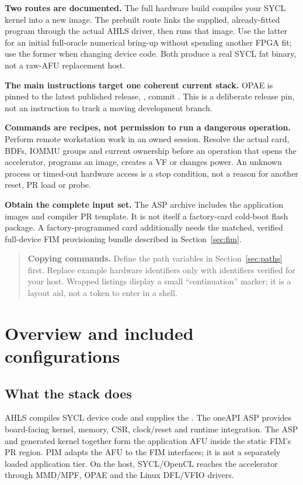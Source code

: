 \documentclass[11pt,letterpaper]{article}
\newcommand{\code}[1]{{\ttfamily\expandafter\seqsplit\expandafter{\detokenize{#1}}}}
\newcommand{\src}[1]{\cite{S#1}}
\newcommand{\stepnote}[2]{\begin{quote}\small\textbf{#1.} #2\end{quote}}
\begin{document}
\textbf{Two routes are documented.} The full hardware build compiles your SYCL
kernel into a new image. The prebuilt route links the supplied, already-fitted
program through the actual AHLS driver, then runs that image. Use the latter for
an initial full-oracle numerical bring-up without spending another FPGA fit;
use the former when changing device code. Both produce a real SYCL \code{.fpga}
fat binary, not a raw-AFU replacement host.\src{11}

\textbf{The main instructions target one coherent current stack.} OPAE is pinned
to the latest published release, \code{2.14.0-3}, commit
. This is a deliberate release pin,
not an instruction to track a moving development branch.\src{17}

\textbf{Commands are recipes, not permission to run a dangerous operation.}
Perform remote workstation work in an owned \code{tmux} session. Resolve the
actual card, BDFs, IOMMU groups and current ownership before an operation that
opens the accelerator, programs an image, creates a VF or changes power.
An unknown process or timed-out hardware access is a stop condition, not a
reason for another reset, PR load or probe.\src{10}

\textbf{Obtain the complete input set.} The ASP archive includes the application
images and compiler PR template. It is not itself a factory-card cold-boot flash
package. A factory-programmed card additionally needs the matched, verified
full-device FIM provisioning bundle described in Section~\ref{sec:fim}.\src{8}

\stepnote{Copying commands}{Define the path variables in Section~\ref{sec:paths}
first. Replace example hardware identifiers only with identifiers verified for
your host. Wrapped listings display a small ``continuation'' marker; it is a
layout aid, not a token to enter in a shell.}
\clearpage
{}
\section{Overview and included configurations}
\label{sec:overview}
\subsection{What the stack does}
AHLS compiles SYCL device code and supplies the \code{kernel_system}. The
oneAPI ASP provides board-facing kernel, memory, CSR, clock/reset and runtime
integration. The ASP and generated kernel together form the application AFU
inside the static FIM's PR region. PIM adapts the AFU to the FIM interfaces; it
is not a separately loaded application tier. On the host, SYCL/OpenCL reaches
the accelerator through MMD/MPF, OPAE and the Linux DFL/VFIO drivers.\src{3}
\end{document}

